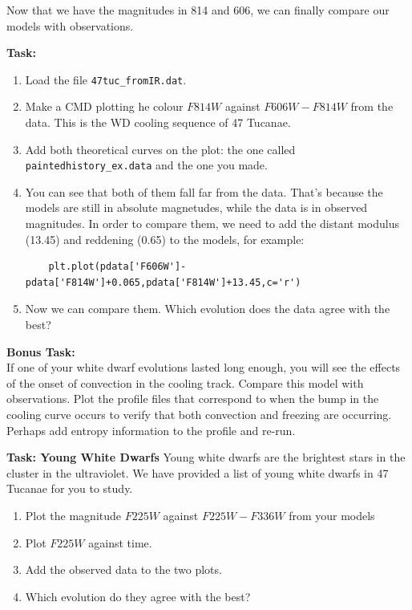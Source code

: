 \documentclass{article}
\begin{document}
Now that we have the magnitudes in 814 and 606, we can finally compare our models with observations.

\textbf{Task:}\vspace{-1em}
\begin{enumerate}
\item Load the file \texttt{47tuc\_fromIR.dat}.
\item Make a CMD plotting he colour $F814W$ against $F606W-F814W$ from the data. This is the WD cooling sequence of 47 Tucanae.
\item Add both theoretical curves on the plot: the one called \texttt{paintedhistory\_ex.data} and the one you made.
\item You can see that both of them fall far from the data. That's because the models are still in absolute magnetudes, while the data is in observed magnitudes. In order to compare them, we need to add the distant modulus (13.45) and reddening (0.65) to the models, for example:
\begin{verbatim}
    plt.plot(pdata['F606W']-pdata['F814W']+0.065,pdata['F814W']+13.45,c='r')
\end{verbatim}
\item Now we can compare them. Which evolution does the data agree with the best?
\end{enumerate}



\textbf{Bonus Task:}\\
If one of your white dwarf evolutions lasted long enough, you will see the effects of the onset of convection in the cooling track.  Compare this model with observations.   Plot the profile files that correspond to when the bump in the cooling curve occurs to verify that both convection and freezing are occurring.   Perhaps add entropy information to the profile and re-run. 


\textbf{Task: Young White Dwarfs}
Young white dwarfs are the brightest stars in the cluster in the ultraviolet.  We have provided a list of young white dwarfs in 47 Tucanae for you to study.
\begin{enumerate}
 \setlength\itemsep{0em}
\item Plot the magnitude $F225W$ against $F225W-F336W$ from your models
\item Plot $F225W$ against time.
\item Add the observed  data to the two plots.  
\item Which evolution do they agree with the best?
\end{enumerate}
\end{document}
